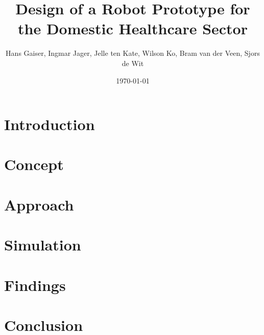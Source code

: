 \documentclass[a4paper,10pt,twocolumn]{article}
\begin{document}


\newcommand{\todo}[1]{\textbf{\textsc{\textcolor{red}{[#1]}}}}
\title{Design of a Robot Prototype for the Domestic Healthcare Sector}
\author{Hans Gaiser, Ingmar Jager, Jelle ten Kate, Wilson Ko, Bram van der Veen, Sjors de Wit}
\date{\today}


\maketitle



\section*{Introduction}
\label{problem}


\section*{Concept}
\label{concept}


\section*{Approach}
\label{approach}


\section*{Simulation}
\label{simulation}


\section*{Findings}
\label{findings}


\section*{Conclusion}
\label{conclusion}


\newpage

\printbibliography
\end{document}
